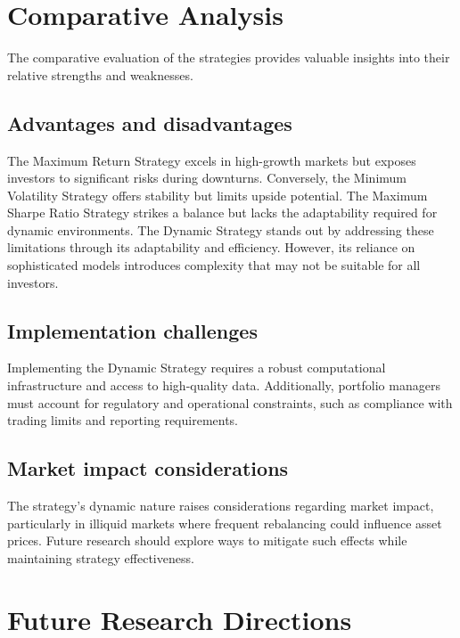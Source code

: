 \section{Comparative Analysis}
The comparative evaluation of the strategies provides valuable insights into their relative strengths and weaknesses.


\subsection{Advantages and disadvantages}
The Maximum Return Strategy excels in high-growth markets but exposes investors to significant risks during downturns. Conversely, the Minimum Volatility Strategy offers stability but limits upside potential. The Maximum Sharpe Ratio Strategy strikes a balance but lacks the adaptability required for dynamic environments.
The Dynamic Strategy stands out by addressing these limitations through its adaptability and efficiency. However, its reliance on sophisticated models introduces complexity that may not be suitable for all investors.
\subsection{Implementation challenges}
Implementing the Dynamic Strategy requires a robust computational infrastructure and access to high-quality data. Additionally, portfolio managers must account for regulatory and operational constraints, such as compliance with trading limits and reporting requirements.
\subsection{Market impact considerations}

The strategy's dynamic nature raises considerations regarding market impact, particularly in illiquid markets where frequent rebalancing could influence asset prices. Future research should explore ways to mitigate such effects while maintaining strategy effectiveness.

\section{Future Research Directions}

